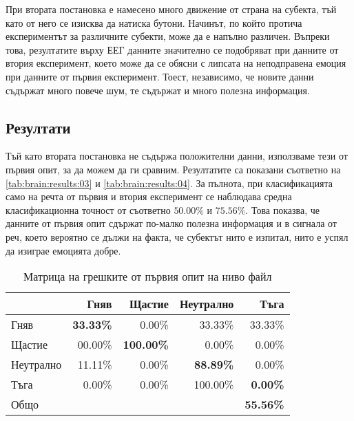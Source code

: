 \documentclass[main.tex]{subfiles}
\begin{document}
При втората постановка е намесено много движение от страна на субекта, тъй като от него се изисква да натиска бутони. Начинът, по който протича експериментът за различните субекти, може да е напълно различен. Въпреки това, резултатите върху ЕЕГ данните значително се подобряват при данните от втория експеримент, което може да се обясни с липсата на неподправена емоция при данните от първия експеримент. Тоест, независимо, че новите данни съдържат много повече шум, те съдържат и много полезна информация. 

\subsection{Резултати}
Тъй като втората постановка не съдържа положителни данни, използваме тези от първия опит, за да можем да ги сравним. Резултатите са показани съответно на \autoref{tab:brain:results:03} и \autoref{tab:brain:results:04}. За пълнота, при класификацията само на речта от първия и втория експеримент се наблюдава средна класификационна точност от съответно $50.00\%$ и $75.56\%$. Това показва, че данните от първия опит сдържат по-малко полезна информация и в сигнала от реч, което вероятно се дължи на факта, че субектът нито е изпитал, нито е успял да изиграе емоцията добре.


\begin{table}[h]
    \begin{center}
    \begin{tabular}{|l|r r r r|} 
        \hline
        & Гняв & Щастие & Неутрално & Тъга \\ 
        \hline
        Гняв &  \textbf{33.33\%} & 0.00\% & 33.33\% & 33.33\% \\ 
        Щастие & 00.00\% & \textbf{100.00\%} & 0.00\% & 0.00\% \\ 
        Неутрално & 11.11\% & 0.00\% & \textbf{88.89\%} & 0.00\% \\ 
        Тъга & 0.00\% & 0.00\% & 100.00\% & \textbf{0.00\%}\\ 
        \hline
        \hline
        Общо & & & & \textbf{55.56\%}\\
        \hline
    \end{tabular}
    \caption{Матрица на грешките от първия опит на ниво файл}
    \label{tab:brain:results:03}
    \end{center}
\end{table}
\end{document}
